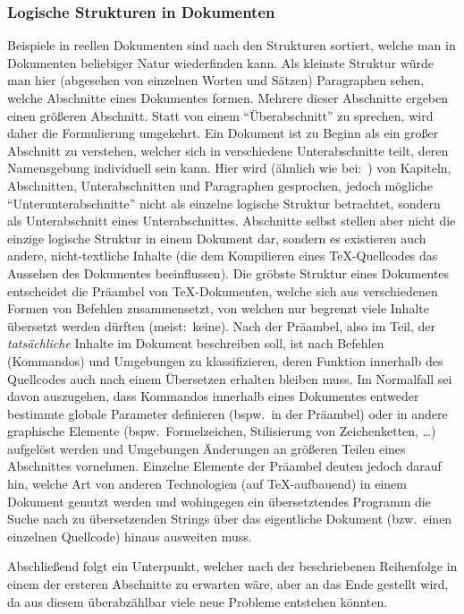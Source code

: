 \subsubsection*{Logische Strukturen in Dokumenten}\label{subsec:logicInDocuments}
Beispiele in reellen Dokumenten sind nach den Strukturen sortiert, welche man in Dokumenten beliebiger Natur wiederfinden kann. Als kleinste Struktur würde man hier (abgesehen von einzelnen Worten und Sätzen) Paragraphen sehen, welche Abschnitte eines Dokumentes formen. Mehrere dieser Abschnitte ergeben einen größeren Abschnitt. Statt von einem \enquote{Überabschnitt} zu sprechen, wird daher die Formulierung umgekehrt. Ein Dokument ist zu Beginn als ein großer Abschnitt zu verstehen, welcher sich in verschiedene Unterabschnitte teilt, deren Namensgebung individuell sein kann. Hier wird (ähnlich wie bei:~\cite{texbook}) von Kapiteln, Abschnitten, Unterabschnitten und Paragraphen gesprochen, jedoch mögliche \enquote{Unterunterabschnitte} nicht als einzelne logische Struktur betrachtet, sondern als Unterabschnitt eines Unterabschnittes. 
Abschnitte selbst stellen aber nicht die einzige logische Struktur in einem Dokument dar, sondern es existieren auch andere, nicht-textliche Inhalte (die dem Kompilieren eines \TeX{}-Quellcodes das Aussehen des Dokumentes beeinflussen). 
Die gröbste Struktur eines Dokumentes entscheidet die Präambel von \TeX{}-Dokumenten, welche sich aus verschiedenen Formen von Befehlen zusammensetzt, von welchen nur begrenzt viele Inhalte übersetzt werden dürften (meist:\ keine).
Nach der Präambel, also im Teil, der \textit{tatsächliche} Inhalte im Dokument beschreiben soll, ist nach Befehlen (Kommandos) und Umgebungen zu klassifizieren, deren Funktion innerhalb des Quellcodes auch nach einem Übersetzen erhalten bleiben muss. Im Normalfall sei davon auszugehen, dass Kommandos innerhalb eines Dokumentes entweder bestimmte globale Parameter definieren (bspw.\ in der Präambel) oder in andere graphische Elemente (bspw.\ Formelzeichen, Stilisierung von Zeichenketten, \ldots) aufgelöst werden und Umgebungen Änderungen an größeren Teilen eines Abschnittes vornehmen. Einzelne Elemente der Präambel deuten jedoch darauf hin, welche Art von anderen Technologien (auf \TeX{}-aufbauend) in einem Dokument genutzt werden und wohingegen ein übersetztendes Programm die Suche nach zu übersetzenden Strings über das eigentliche Dokument (bzw.\ einen einzelnen Quellcode) hinaus ausweiten muss.

Abschließend folgt ein Unterpunkt, welcher nach der beschriebenen Reihenfolge in einem der ersteren Abschnitte zu erwarten wäre, aber an das Ende gestellt wird, da aus diesem überabzählbar viele neue Probleme entstehen könnten.%

